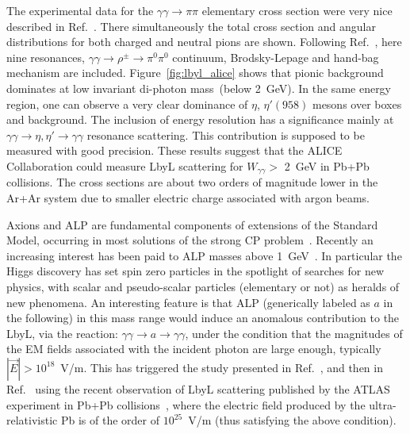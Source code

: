 The experimental data for the $\gamma\gamma\to\pi\pi$ elementary cross section were very nice described in Ref.~\cite{Klusek-Gawenda:2013rtu}.
There simultaneously the total cross section and angular distributions for both charged and neutral pions are shown.
Following Ref.~\cite{Klusek-Gawenda:2013rtu}, here nine resonances,
$\gamma\gamma\to\rho^\pm\to\pi^0\pi^0$ continuum, Brodsky-Lepage and hand-bag mechanism are included. Figure~\ref{fig:lbyl_alice} shows that pionic background dominates at low invariant di-photon mass~(below 2~GeV).
In the same energy region, one can observe a very clear dominance of
$\eta$, $\eta'(958)$ mesons over boxes and background.
The inclusion of energy resolution has a significance mainly at
$\gamma\gamma\to\eta,\eta'\to\gamma\gamma$ resonance scattering.
This contribution is supposed to be measured with good precision.
These results suggest that the ALICE Collaboration could measure LbyL scattering for $W_{\gamma\gamma}>$ 2~GeV in Pb+Pb collisions. The cross sections are about two orders of magnitude lower in the Ar+Ar system due to smaller electric charge associated with argon beams.


Axions and ALP are fundamental components of extensions of the Standard Model, occurring in most solutions of the strong CP problem~\cite{Peccei:1977hh,PhysRevLett.38.1440}. Recently an increasing interest has been paid to ALP masses
above 1~GeV~\cite{Bauer:2017ris}. In particular the Higgs discovery has set spin zero particles in the spotlight of searches for new physics, with scalar and pseudo-scalar particles (elementary or not) as heralds of new phenomena. An interesting feature is that ALP (generically labeled as $a$ in the following) in this mass range would induce an anomalous contribution to the LbyL, via the reaction:
$\gamma \gamma \rightarrow a \rightarrow \gamma \gamma$,
under the condition that the magnitudes of the EM fields associated
with the incident photon are large enough, typically $\left|\vec{E}\right| >10^{18}$~V/m.
This has triggered  the study presented in Ref.~\cite{Knapen:2016moh},
and then in Ref.~\cite{Knapen:2017ebd} using the recent observation of LbyL scattering published by the ATLAS experiment in Pb+Pb collisions~\cite{Aaboud:2017bwk}, where the electric field produced by the ultra-relativistic Pb is of the order of $10^{25}$~V/m (thus satisfying the above condition).

